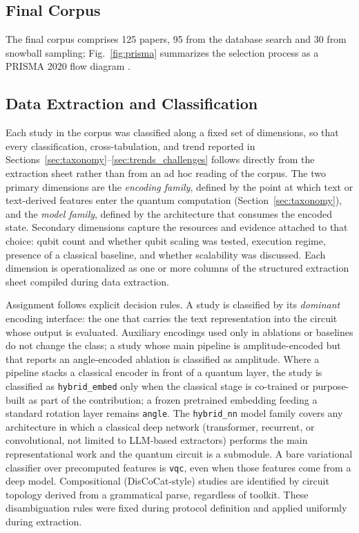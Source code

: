 \documentclass{ieeeaccess}
\begin{document}
\subsection{Final Corpus}
\label{subsec:corpus}
The final corpus comprises 125 papers, 95 from the database search and 30 from snowball sampling; Fig.~\ref{fig:prisma} summarizes the selection process as a PRISMA 2020 flow diagram \cite{page2021prisma}.

\subsection{Data Extraction and Classification}
\label{subsec:analysis_framework}

Each study in the corpus was classified along a fixed set of dimensions, so that every classification, cross-tabulation, and trend reported in Sections~\ref{sec:taxonomy}--\ref{sec:trends_challenges} follows directly from the extraction sheet rather than from an ad hoc reading of the corpus. The two primary dimensions are the \emph{encoding family}, defined by the point at which text or text-derived features enter the quantum computation (Section~\ref{sec:taxonomy}), and the \emph{model family}, defined by the architecture that consumes the encoded state. Secondary dimensions capture the resources and evidence attached to that choice: qubit count and whether qubit scaling was tested, execution regime, presence of a classical baseline, and whether scalability was discussed. Each dimension is operationalized as one or more columns of the structured extraction sheet compiled during data extraction.

Assignment follows explicit decision rules. A study is classified by its \emph{dominant} encoding interface: the one that carries the text representation into the circuit whose output is evaluated. Auxiliary encodings used only in ablations or baselines do not change the class; a study whose main pipeline is amplitude-encoded but that reports an angle-encoded ablation is classified as amplitude. Where a pipeline stacks a classical encoder in front of a quantum layer, the study is classified as \texttt{hybrid\_embed} only when the classical stage is co-trained or purpose-built as part of the contribution; a frozen pretrained embedding feeding a standard rotation layer remains \texttt{angle}. The \texttt{hybrid\_nn} model family covers any architecture in which a classical deep network (transformer, recurrent, or convolutional, not limited to LLM-based extractors) performs the main representational work and the quantum circuit is a submodule. A bare variational classifier over precomputed features is \texttt{vqc}, even when those features come from a deep model. Compositional (DisCoCat-style) studies are identified by circuit topology derived from a grammatical parse, regardless of toolkit. These disambiguation rules were fixed during protocol definition and applied uniformly during extraction.
\end{document}
